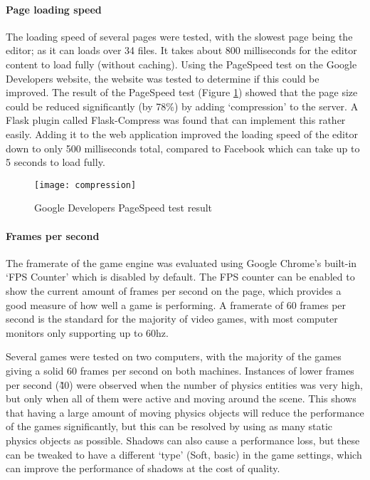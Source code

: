 	\paragraph{Page loading speed}
	The loading speed of several pages were tested, with the slowest page being the editor; as it can loads over 34 files. It takes about 800 milliseconds for the editor content to load fully (without caching). Using the PageSpeed test on the Google Developers website, the website was tested to determine if this could be improved. The result of the PageSpeed test (Figure \ref{fig:pagespeed}) showed that the page size could be reduced significantly (by 78\%) by adding `compression' to the server. A Flask plugin called Flask-Compress was found that can implement this rather easily. Adding it to the web application improved the loading speed of the editor down to only 500 milliseconds total, compared to Facebook which can take up to 5 seconds to load fully.


\begin{figure}[h]
	\centering
	\texttt{[image: compression]}
	\caption{Google Developers PageSpeed test result}
	\label{fig:pagespeed}
\end{figure}

	\paragraph{Frames per second}
	The framerate of the game engine was evaluated using Google Chrome's built-in `FPS Counter' which is disabled by default. The FPS counter can be enabled to show the current amount of frames per second on the page, which provides a good measure of how well a game is performing. A framerate of 60 frames per second is the standard for the majority of video games, with most computer monitors only supporting up to 60hz.

	Several games were tested on two computers, with the majority of the games giving a solid 60 frames per second on both machines. Instances of lower frames per second (\~40) were observed when the number of physics entities was very high, but only when all of them were active and moving around the scene. This shows that having a large amount of moving physics objects will reduce the performance of the games significantly, but this can be resolved by using as many static physics objects as possible. Shadows can also cause a performance loss, but these can be tweaked to have a different `type' (Soft, basic) in the game settings, which can improve the performance of shadows at the cost of quality.

